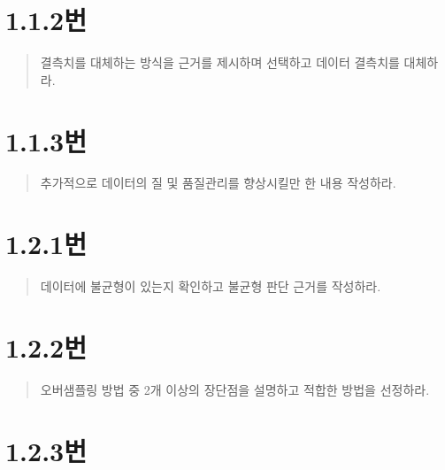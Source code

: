 \documentclass[
  letterpaper,
  DIV=11,
  numbers=noendperiod]{scrreprt}
\begin{document}
\hypertarget{uxbc88-79}{%
\section*{1.1.2번}\label{uxbc88-79}}


\begin{quote}
결측치를 대체하는 방식을 근거를 제시하며 선택하고 데이터 결측치를
대체하라.
\end{quote}

\hypertarget{uxbc88-80}{%
\section*{1.1.3번}\label{uxbc88-80}}


\begin{quote}
추가적으로 데이터의 질 및 품질관리를 향상시킬만 한 내용 작성하라.
\end{quote}

\hypertarget{uxbc88-81}{%
\section*{1.2.1번}\label{uxbc88-81}}


\begin{quote}
데이터에 불균형이 있는지 확인하고 불균형 판단 근거를 작성하라.
\end{quote}

\hypertarget{uxbc88-82}{%
\section*{1.2.2번}\label{uxbc88-82}}


\begin{quote}
오버샘플링 방법 중 2개 이상의 장단점을 설명하고 적합한 방법을 선정하라.
\end{quote}

\hypertarget{uxbc88-83}{%
\section*{1.2.3번}\label{uxbc88-83}}
\end{document}
